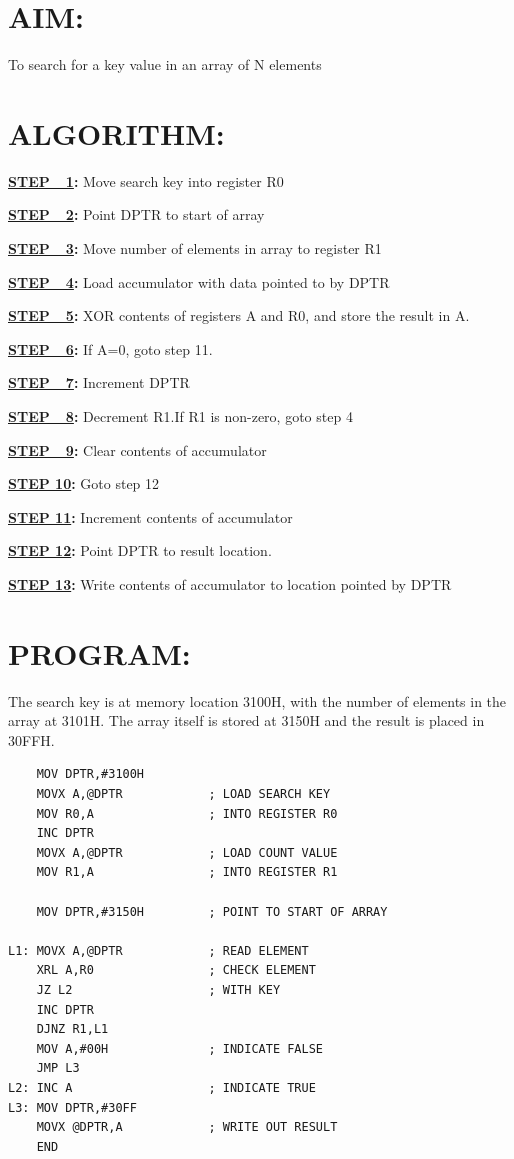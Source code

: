 \documentclass[a4paper,28pt,twoside,openright]{report}
\begin{document}
\section*{AIM:}
To search for a key value in an array of N elements
\section*{ALGORITHM:}
\textbf{\underline{STEP\ \ 1}:} Move search key into register R0


\textbf{\underline{STEP\ \ 2}:}  Point DPTR to start of array

\textbf{\underline{STEP\ \ 3}:}  Move number of elements in array to register R1

\textbf{\underline{STEP\ \ 4}:}  Load accumulator with data pointed to by DPTR

\textbf{\underline{STEP\ \ 5}:}  XOR contents of registers A and R0, and store the result in A.

\textbf{\underline{STEP\ \ 6}:}  If A=0, goto step 11.

\textbf{\underline{STEP\ \ 7}:}  Increment DPTR

\textbf{\underline{STEP\ \ 8}:}  Decrement R1.If R1 is non-zero, goto step 4

\textbf{\underline{STEP\ \ 9}:}  Clear contents of accumulator

\textbf{\underline{STEP 10}:} Goto step 12

\textbf{\underline{STEP 11}:} Increment contents of accumulator

\textbf{\underline{STEP 12}:} Point DPTR to result location.

\textbf{\underline{STEP 13}:} Write contents of accumulator to location pointed by DPTR
\newpage
\section*{PROGRAM:}
The search key is at memory location 3100H, with the number of elements in the array at 3101H. The array itself is stored at 3150H and the result is placed in 30FFH.\newline
\begin{lstlisting}
    MOV DPTR,#3100H
    MOVX A,@DPTR            ; LOAD SEARCH KEY
    MOV R0,A                ; INTO REGISTER R0
    INC DPTR
    MOVX A,@DPTR            ; LOAD COUNT VALUE
    MOV R1,A                ; INTO REGISTER R1
    
    MOV DPTR,#3150H         ; POINT TO START OF ARRAY
              
L1: MOVX A,@DPTR            ; READ ELEMENT
    XRL A,R0                ; CHECK ELEMENT
    JZ L2                   ; WITH KEY
    INC DPTR
    DJNZ R1,L1
    MOV A,#00H              ; INDICATE FALSE
    JMP L3
L2: INC A                   ; INDICATE TRUE
L3: MOV DPTR,#30FF
    MOVX @DPTR,A            ; WRITE OUT RESULT
    END
\end{lstlisting}
\end{document}
